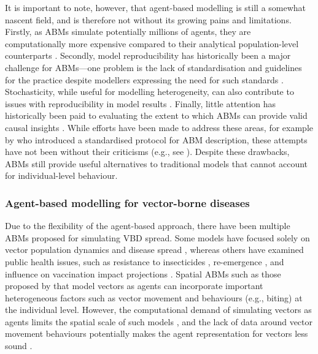 It is important to note, however, that agent-based modelling is still a somewhat nascent field, and is therefore not without its growing pains and limitations. Firstly, as ABMs simulate potentially millions of agents, they are computationally more expensive compared to their analytical population-level counterparts \cite{borshchev_system_2004, axtell_agent-based_2022}. Secondly, model reproducibility has historically been a major challenge for ABMs---one problem is the lack of standardisation and guidelines for the practice \cite{collins_call_2015} despite modellers expressing the need for such standards \cite{janssen_towards_2008}. Stochasticity, while useful for modelling heterogeneity, can also contribute to issues with reproducibility in model results \cite{fitzpatrick_issues_2019}. Finally, little attention has historically been paid to evaluating the extent to which ABMs can provide valid causal insights \cite{marshall_formalizing_2015}. While efforts have been made to address these areas, for example by \citet{grimm_standard_2006} who introduced a standardised protocol for ABM description, these attempts have not been without their criticisms (e.g., see \citet{donkin_replicating_2017}). Despite these drawbacks, ABMs still provide useful alternatives to traditional models that cannot account for individual-level behaviour.

\subsubsection{Agent-based modelling for vector-borne diseases}

Due to the flexibility of the agent-based approach, there have been multiple ABMs proposed for simulating VBD spread. Some models have focused solely on vector population dynamics and disease spread \cite{jacintho_agent-based_2010, maneerat_spatial_2016, dommar_agent-based_2014, krzhizhanovskaya_agent-based_2020}, whereas others have examined public health issues, such as resistance to insecticides \cite{selvaraj_vector_2020}, re-emergence \cite{linard_multi-agent_2009}, and influence on vaccination impact projections \cite{perkins_agent-based_2019}. Spatial ABMs such as those proposed by \citet{jacintho_agent-based_2010} that model vectors as agents can incorporate important heterogeneous factors such as vector movement and behaviours (e.g., biting) at the individual level. However, the computational demand of simulating vectors as agents limits the spatial scale of such models \cite{manore_network-patch_2015, de_mooij_framework_2023}, and the lack of data around vector movement behaviours potentially makes the agent representation for vectors less sound \cite{jacintho_agent-based_2010, maneerat_spatial_2016}.

